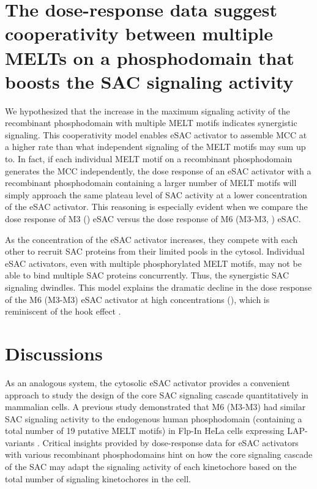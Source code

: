 \section{The dose-response data suggest cooperativity between multiple MELTs on a  phosphodomain that boosts the SAC signaling activity}
\label{ProzoneEffectModel}
We hypothesized that the increase in the maximum signaling activity of the recombinant  phosphodomain with multiple MELT motifs indicates synergistic signaling. This cooperativity model enables eSAC activator to assemble MCC at a higher rate than what independent signaling of the MELT motifs may sum up to. In fact, if each individual MELT motif on a recombinant  phosphodomain generates the MCC independently, the dose response of an eSAC activator with a recombinant phosphodomain containing a larger number of MELT motifs will simply approach the same plateau level of SAC activity at a lower concentration of the eSAC activator. This reasoning is especially evident when we compare the dose response of M3 () eSAC versus the dose response of M6 (M3-M3, ) eSAC.

As the concentration of the eSAC activator increases, they compete with each other to recruit SAC proteins from their limited pools in the cytosol. Individual eSAC activators, even with multiple phosphorylated MELT motifs, may not be able to bind multiple SAC proteins concurrently. Thus, the synergistic SAC signaling dwindles. This model explains the dramatic decline in the dose response of the M6 (M3-M3) eSAC activator at high concentrations (), which is reminiscent of the hook effect \cite{HookEffect}.

\section{Discussions}
\label{eSACDiscussions}
As an analogous system, the cytosolic eSAC activator provides a convenient approach to study the design of the core SAC signaling cascade quantitatively in mammalian cells. A previous study demonstrated that M6 (M3-M3) had similar SAC signaling activity to the endogenous human  phosphodomain (containing a total number of 19 putative MELT motifs) in Flp-In HeLa cells expressing LAP- variants \cite{RecombinantKNL1}. Critical insights provided by dose-response data for eSAC activators with various recombinant phosphodomains hint on how the core signaling cascade of the SAC may adapt the signaling activity of each kinetochore based on the total number of signaling kinetochores in the cell.

